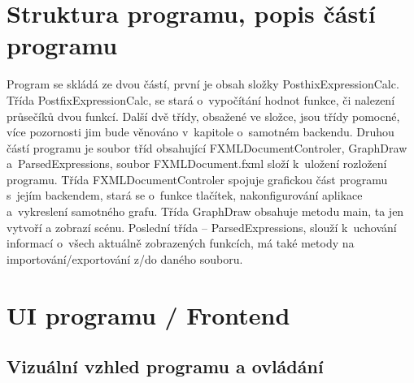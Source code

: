 \documentclass[a4paper,oneside,12p]{report}
\begin{document}


\tableofcontents
\newpage
{}
\setcounter{page}{1}




\chapter{Struktura programu, popis částí programu}


\medskip
Program se skládá ze dvou částí, první je obsah složky PosthixExpressionCalc.
Třída PostfixExpressionCalc, se stará o~vypočítání hodnot funkce, či nalezení průsečíků dvou funkcí.
Další dvě třídy, obsažené ve složce, jsou třídy pomocné, více pozornosti jim bude věnováno v~kapitole o~samotném backendu.
Druhou částí programu je soubor tříd obsahující FXMLDocumentControler, GraphDraw a~ParsedExpressions, soubor FXMLDocument.fxml složí k~uložení rozložení programu.
Třída FXMLDocumentControler spojuje grafickou část programu s~jejím backendem, stará se o~funkce tlačítek, nakonfigurování aplikace a~vykreslení samotného grafu.
Třída GraphDraw obsahuje metodu main, ta jen vytvoří a zobrazí scénu.
Poslední třída -- ParsedExpressions, slouží k~uchování informací o~všech aktuálně zobrazených funkcích, má také metody na importování/exportování z/do daného souboru.

\chapter{UI programu / Frontend}

\section{Vizuální vzhled programu a ovládání}
\end{document}
